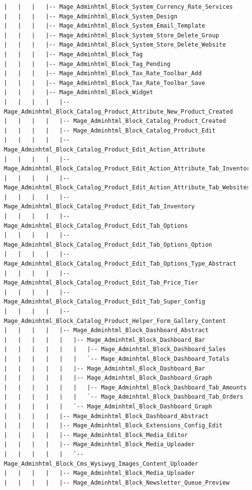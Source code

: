 \documentclass[oneside]{book}
\begin{document}
\begin{lstlisting}
|   |   |   |-- Mage_Adminhtml_Block_System_Currency_Rate_Services
|   |   |   |-- Mage_Adminhtml_Block_System_Design
|   |   |   |-- Mage_Adminhtml_Block_System_Email_Template
|   |   |   |-- Mage_Adminhtml_Block_System_Store_Delete_Group
|   |   |   |-- Mage_Adminhtml_Block_System_Store_Delete_Website
|   |   |   |-- Mage_Adminhtml_Block_Tag
|   |   |   |-- Mage_Adminhtml_Block_Tag_Pending
|   |   |   |-- Mage_Adminhtml_Block_Tax_Rate_Toolbar_Add
|   |   |   |-- Mage_Adminhtml_Block_Tax_Rate_Toolbar_Save
|   |   |   |-- Mage_Adminhtml_Block_Widget
|   |   |   |   |-- Mage_Adminhtml_Block_Catalog_Product_Attribute_New_Product_Created
|   |   |   |   |-- Mage_Adminhtml_Block_Catalog_Product_Created
|   |   |   |   |-- Mage_Adminhtml_Block_Catalog_Product_Edit
|   |   |   |   |-- Mage_Adminhtml_Block_Catalog_Product_Edit_Action_Attribute
|   |   |   |   |-- Mage_Adminhtml_Block_Catalog_Product_Edit_Action_Attribute_Tab_Inventory
|   |   |   |   |-- Mage_Adminhtml_Block_Catalog_Product_Edit_Action_Attribute_Tab_Websites
|   |   |   |   |-- Mage_Adminhtml_Block_Catalog_Product_Edit_Tab_Inventory
|   |   |   |   |-- Mage_Adminhtml_Block_Catalog_Product_Edit_Tab_Options
|   |   |   |   |-- Mage_Adminhtml_Block_Catalog_Product_Edit_Tab_Options_Option
|   |   |   |   |-- Mage_Adminhtml_Block_Catalog_Product_Edit_Tab_Options_Type_Abstract
|   |   |   |   |-- Mage_Adminhtml_Block_Catalog_Product_Edit_Tab_Price_Tier
|   |   |   |   |-- Mage_Adminhtml_Block_Catalog_Product_Edit_Tab_Super_Config
|   |   |   |   |-- Mage_Adminhtml_Block_Catalog_Product_Helper_Form_Gallery_Content
|   |   |   |   |-- Mage_Adminhtml_Block_Dashboard_Abstract
|   |   |   |   |   |-- Mage_Adminhtml_Block_Dashboard_Bar
|   |   |   |   |   |   |-- Mage_Adminhtml_Block_Dashboard_Sales
|   |   |   |   |   |   `-- Mage_Adminhtml_Block_Dashboard_Totals
|   |   |   |   |   |-- Mage_Adminhtml_Block_Dashboard_Bar
|   |   |   |   |   |-- Mage_Adminhtml_Block_Dashboard_Graph
|   |   |   |   |   |   |-- Mage_Adminhtml_Block_Dashboard_Tab_Amounts
|   |   |   |   |   |   `-- Mage_Adminhtml_Block_Dashboard_Tab_Orders
|   |   |   |   |   `-- Mage_Adminhtml_Block_Dashboard_Graph
|   |   |   |   |-- Mage_Adminhtml_Block_Dashboard_Abstract
|   |   |   |   |-- Mage_Adminhtml_Block_Extensions_Config_Edit
|   |   |   |   |-- Mage_Adminhtml_Block_Media_Editor
|   |   |   |   |-- Mage_Adminhtml_Block_Media_Uploader
|   |   |   |   |   `-- Mage_Adminhtml_Block_Cms_Wysiwyg_Images_Content_Uploader
|   |   |   |   |-- Mage_Adminhtml_Block_Media_Uploader
|   |   |   |   |-- Mage_Adminhtml_Block_Newsletter_Queue_Preview

\end{lstlisting}
\end{document}
